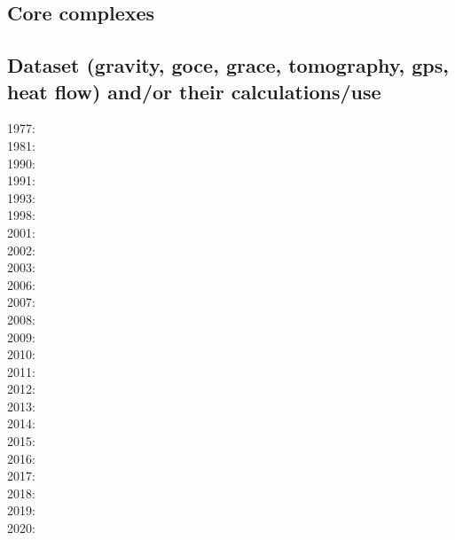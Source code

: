 \subsection{Core complexes}

{\scriptsize
\noindent
\cite{gewm07}
\cite{tibb08}
\cite{tigv09}
\cite{olbt10}
\cite{lehm12}\cite{scgb12}
\cite{pebu15}
\cite{esmp17}
\cite{brst18}
}

\subsection{Dataset (gravity, goce, grace, tomography, gps, heat flow) 
and/or their calculations/use}

\noindent
{\scriptsize
1977: \cite{rola77}\\
1981: \cite{dzan81}\\
1990: \cite{lips90}\\
1991: \cite{spak91}\\
1993: \cite{kara93}\\
1998: \cite{bisp98}\\
2001: \cite{buda01}\\
2002: \cite{bebo02}\\
2003: \cite{krhh03}\cite{sosi03}\cite{pimo03}\cite{sosi03}\\
2006: \cite{masr06}\cite{arte06}\\
2007: \cite{mitk07}\cite{lobc07}\cite{rimb07}\\
2008: \cite{zhou08}\cite{zhou08}\cite{roma08}\cite{tekc08}\\
2009: \cite{scbr09}\\
2010: \cite{dada10}\cite{sifb10}\cite{katc10}\\
2011: \cite{ridv11}\\
2012: \cite{hawj12}\cite{resa12}\cite{hawj12}\cite{fesw12}\cite{simj12}\cite{beck12}\cite{pahk12}\\
2013: \cite{ress13}\cite{ebbf13}\cite{davi13}\cite{scle13}\cite{waja13}\\
2014: \cite{paml14}\cite{ebbf14}\cite{krbk14}\cite{licl14}\cite{aubb14}\\
2015: \cite{boem15}\cite{brrs15}\cite{furc15}\\
2016: \cite{kord16}\cite{moek16}\cite{rond16}\cite{duti16}\cite{cogb16}\\
2017: \cite{roev17}\\
2018: \cite{pabn18}\cite{hamp18}\cite{ghmc18}\cite{homs18}\\
2019: \cite{sopg19}\cite{shar19}\cite{afss19}\\
2020: \cite{rovb20}
}

